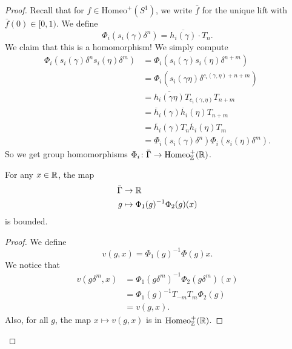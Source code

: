\documentclass[a4paper]{article}
\newcommand\Homeo{\mathrm{Homeo}}
\begin{document}
\begin{proof}
  Recall that for $f \in \Homeo^+(S^1)$, we write $\bar{f}$ for the unique lift with $\bar{f}(0) \in [0, 1)$. We define
  \[
    \Phi_i (s_i(\gamma) \delta^n) = \overline{h_i(\gamma)} \cdot T_n.
  \]
  We claim that this is a homomorphism! We simply compute
  \begin{align*}
    \Phi_i (s_i(\gamma) \delta^n s_i(\eta) \delta^m) &= \Phi_i(s_i(\gamma) s_i(\eta) \delta^{n + m})\\
    &= \Phi_i(s_i(\gamma \eta) \delta^{c_i(\gamma, \eta) + n + m})\\
    &= \overline{h_i(\gamma \eta)} T_{c_i(\gamma, \eta)} T_{n + m}\\
    &= \overline{h}_i(\gamma) \overline{h}_i(\eta) T_{n + m}\\
    &= \overline{h}_i(\gamma) T_n \overline{h}_i(\eta) T_m\\
    &= \Phi_i(s_i(\gamma) \delta^n) \Phi_i(s_i(\eta) \delta^m).
  \end{align*}
  So we get group homomorphisms $\Phi_i\colon \bar{\Gamma} \to \Homeo^+_\Z(\R)$.

  \begin{claim}
    For any $x \in \mathbb{R}$, the map
    \begin{align*}
      \bar{\Gamma} &\to \mathbb{R}\\
      g &\mapsto \Phi_1(g)^{-1} \Phi_2(g) (x)
    \end{align*}
    is bounded.
  \end{claim}

  \begin{proof}
    We define
    \[
      v(g, x) = \Phi_1(g)^{-1} \Phi(g)x.
    \]
    We notice that
    \begin{align*}
      v(g \delta^m, x) &= \Phi_1(g \delta^m)^{-1} \Phi_2(g \delta^m)(x)\\
      &= \Phi_1(g)^{-1} T_{-m} T_m \Phi_2(g)\\
      &= v(g, x).
    \end{align*}
    Also, for all $g$, the map $x \mapsto v(g, x)$ is in $\Homeo^+_\Z(\R)$.


\end{proof}
\end{proof}
\end{document}
